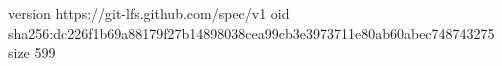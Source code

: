 version https://git-lfs.github.com/spec/v1
oid sha256:dc226f1b69a88179f27b14898038cea99cb3e3973711e80ab60abec748743275
size 599
